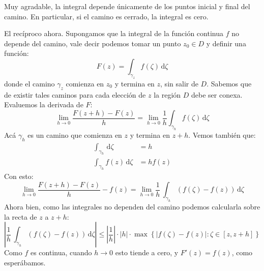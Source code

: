   Muy agradable,
  la integral depende únicamente
  de los puntos inicial y final del camino.
  En particular,
  si el camino es cerrado,
  la integral es cero.

  El recíproco ahora.
  Supongamos que la integral de la función continua \(f\)
  no depende del camino,
  vale decir podemos tomar un punto \(z_0 \in D\)
  y definir una función:
  \begin{equation*}
    F(z)
      = \int_{\gamma_z} f(\zeta) \, \mathrm{d} \zeta
  \end{equation*}
  donde el camino \(\gamma_z\)
  comienza en \(z_0\) y termina en \(z\),
  sin salir de \(D\).
  Sabemos que de existir tales caminos para cada elección de \(z\)
  la región \(D\) debe ser conexa.
  Evaluemos la derivada de \(F\):
  \begin{equation*}
    \lim_{h \rightarrow 0}
      \frac{F(z + h) - F(z)}{h}
      = \lim_{h \rightarrow 0}
	  \frac{1}{h} \int_{\gamma_h} f(\zeta) \, \mathrm{d} \zeta
  \end{equation*}
  Acá \(\gamma_h\)
  es un camino que comienza en \(z\) y termina en \(z + h\).
  Vemos también que:
  \begin{align*}
    \int_{\gamma_h} \, \mathrm{d} \zeta
      &= h \\
    \int_{\gamma_h} f(z) \, \mathrm{d} \zeta
      &= h f(z)
  \end{align*}
  Con esto:
  \begin{equation*}
    \lim_{h \rightarrow 0}
      \frac{F(z + h) - F(z)}{h}
	- f(z)
      = \lim_{h \rightarrow 0}
	  \frac{1}{h} \, \int_{\gamma_h} (f(\zeta) - f(z))
	  \, \mathrm{d} \zeta
  \end{equation*}
  Ahora bien,
  como las integrales no dependen del camino
  podemos calcularla sobre la recta de \(z\) a \(z + h\):
  \begin{equation*}
    \left\lvert
      \frac{1}{h} \, \int_{\gamma_h} (f(\zeta) - f(z))
	\, \textrm{d} \zeta
    \right\rvert
      \le \left\lvert \frac{1}{h} \right\rvert
	    \cdot \lvert h \rvert
	    \cdot \max \left\{ \lvert f(\zeta) - f(z) \rvert
			   \colon \zeta \in [z, z + h] \right\}
  \end{equation*}
  Como \(f\) es continua,
  cuando \(h \rightarrow 0\) esto tiende a cero,
  y \(F'(z) = f(z)\),
  como esperábamos.

